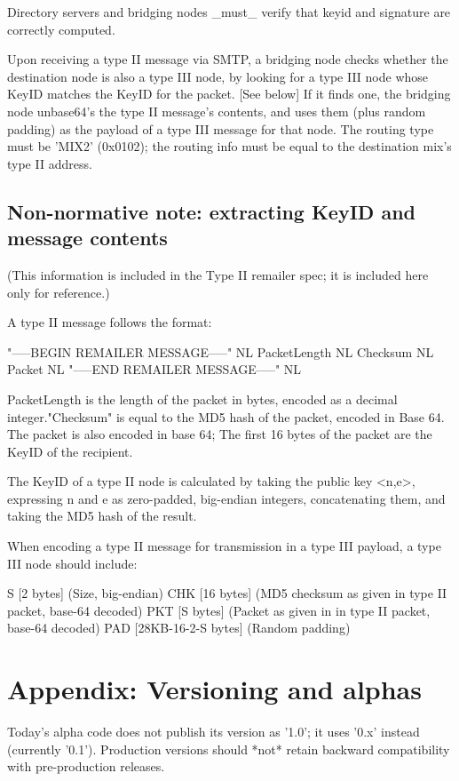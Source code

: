 Directory servers and bridging nodes _must_ verify that keyid and
signature are correctly computed.

Upon receiving a type II message via SMTP, a bridging node checks
whether the destination node is also a type III node, by looking for a
type III node whose KeyID matches the KeyID for the packet. [See below]
If it finds one, the bridging node unbase64's the type II message's 
contents, and uses them (plus random padding) as the payload
of a type III message for that node.  The routing type must be 'MIX2'
(0x0102); the routing info must be equal to the destination mix's
type II address.

\subsection{Non-normative note: extracting KeyID and message contents}

(This information is included in the Type II remailer spec; it is included
here only for reference.)

A type II message follows the format:

"-----BEGIN REMAILER MESSAGE-----" NL
PacketLength NL
Checksum NL
Packet NL
"-----END REMAILER MESSAGE-----" NL

PacketLength is the length of the packet in bytes, encoded as a
decimal integer."Checksum" is equal to the MD5 hash of the packet,
encoded in Base 64.  The packet is also encoded in base 64; The first
16 bytes of the packet are the KeyID of the recipient.

The KeyID of a type II node is calculated by taking the public key
<n,e>, expressing n and e as zero-padded, big-endian integers,
concatenating them, and taking the MD5 hash of the result.

When encoding a type II message for transmission in a type III payload,
a type III node should include:

S   [2 bytes] (Size, big-endian)
CHK [16 bytes] (MD5 checksum as given in type II packet, base-64 decoded)
PKT [S bytes] (Packet as given in in type II packet, base-64 decoded)
PAD [28KB-16-2-S bytes] (Random padding)

\section{Appendix: Versioning and alphas}

Today's alpha code does not publish its version as '1.0'; it uses
'0.x' instead (currently '0.1').  Production versions should *not*
retain backward compatibility with pre-production releases.
